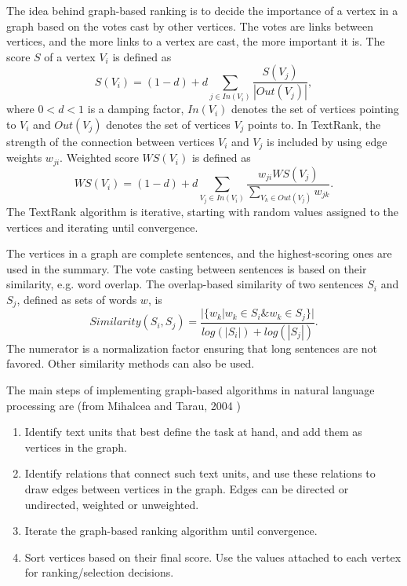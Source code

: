 \documentclass[conference]{IEEEtran}
\begin{document}
The idea behind graph-based ranking is to decide the importance of a vertex in a graph based on the votes cast by other vertices. The votes are links between vertices, and the more links to a vertex are cast, the more important it is. The score $S$ of a vertex $V_i$ is defined as \cite{brin1998}
\begin{equation}
S(V_i) = (1-d)+d \sum \limits_{j \in In(V_i)} \frac{S(V_j)}{|Out(V_j)|},
\end{equation}
where $0 < d < 1$ is a damping factor, $In(V_i)$ denotes the set of vertices pointing to $V_i$ and $Out(V_j)$ denotes the set of vertices $V_j$ points to. In TextRank, the strength of the connection between vertices $V_i$ and $V_j$ is included by using edge weights $w_{ji}$. Weighted score $WS(V_i)$ is defined as
\begin{equation}
WS(V_i) = (1-d) + d \sum \limits_{V_j \in In(V_i)} \frac{w_{ji} WS(V_j)}{\sum \limits_{V_k \in Out(V_j)}w_{jk}}.
\end{equation}
The TextRank algorithm is iterative, starting with random values assigned to the vertices and iterating until convergence.

The vertices in a graph are complete sentences, and the highest-scoring ones are used in the summary. The vote casting between sentences is based on their similarity, e.g. word overlap. The overlap-based similarity of two sentences $S_i$ and $S_j$, defined as sets of words $w$, is \cite{mihalcea2004}
\begin{equation}
Similarity(S_i,S_j) = \frac{|\{w_k|w_k \in S_i \& w_k \in S_j\}|}{log(|S_i|)+log(|S_j|)}.
\end{equation}
The numerator is a normalization factor ensuring that long sentences are not favored. Other similarity methods can also be used.

The main steps of implementing graph-based algorithms in natural language processing are (from Mihalcea and Tarau, 2004 \cite{mihalcea2004})
\begin{enumerate}
	\item Identify text units that best define the task at hand,
	and add them as vertices in the graph.
	\item Identify relations that connect such text units, and
	use these relations to draw edges between vertices
	in the graph. Edges can be directed or undirected,
	weighted or unweighted.
	\item Iterate the graph-based ranking algorithm until convergence.
	\item Sort vertices based on their final score. Use the values
	attached to each vertex for ranking/selection decisions.
\end{enumerate}
\end{document}
